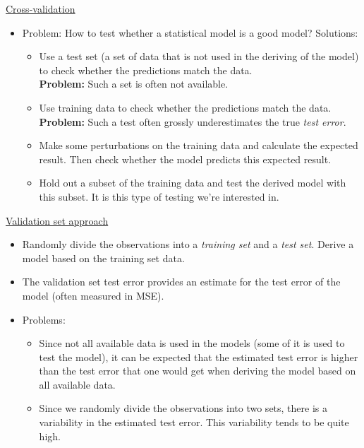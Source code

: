 \underline{Cross-validation}
\begin{itemize}
    \item Problem: How to test whether a statistical model is a good model? Solutions: \begin{itemize}
        \item Use a test set (a set of data that is not used in the deriving of the model) to check whether the predictions match the data.\\
        \textbf{Problem:} Such a set is often not available.
        \item Use training data to check whether the predictions match the data. \\
        \textbf{Problem:} Such a test often grossly underestimates the true \textit{test error}.
        \item Make some perturbations on the training data and calculate the expected result. Then check whether the model predicts this expected result.
        \item Hold out a subset of the training data and test the derived model with this subset. It is this type of testing we're interested in.
    \end{itemize}
\end{itemize}

\underline{Validation set approach}
\begin{itemize}
    \item Randomly divide the observations into a \textit{training set} and a \textit{test set}. Derive a model based on the training set data.
    \item The validation set test error provides an estimate for the test error of the model (often measured in MSE).
    \item Problems: \begin{itemize}
        \item Since not all available data is used in the models (some of it is used to test the model), it can be expected that the estimated test error is higher than the test error that one would get when deriving the model based on all available data.
        \item Since we randomly divide the observations into two sets, there is a variability in the estimated test error. This variability tends to be quite high.
    \end{itemize}
\end{itemize}

